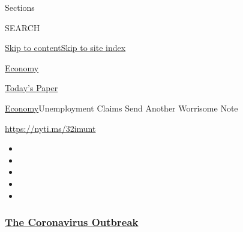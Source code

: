 Sections

SEARCH

\protect\hyperlink{site-content}{Skip to
content}\protect\hyperlink{site-index}{Skip to site index}

\href{https://www.nytimes3xbfgragh.onion/section/business/economy}{Economy}

\href{https://myaccount.nytimes3xbfgragh.onion/auth/login?response_type=cookie\&client_id=vi}{}

\href{https://www.nytimes3xbfgragh.onion/section/todayspaper}{Today's
Paper}

\href{/section/business/economy}{Economy}\textbar{}Unemployment Claims
Send Another Worrisome Note

\url{https://nyti.ms/32imunt}

\begin{itemize}
\item
\item
\item
\item
\item
\end{itemize}

\hypertarget{the-coronavirus-outbreak}{%
\subsubsection{\texorpdfstring{\href{https://www.nytimes3xbfgragh.onion/news-event/coronavirus?name=styln-coronavirus-markets\&region=TOP_BANNER\&block=storyline_menu_recirc\&action=click\&pgtype=Article\&impression_id=6e5788b0-f4c0-11ea-8126-759f148636fd\&variant=undefined}{The
Coronavirus
Outbreak}}{The Coronavirus Outbreak}}\label{the-coronavirus-outbreak}}

